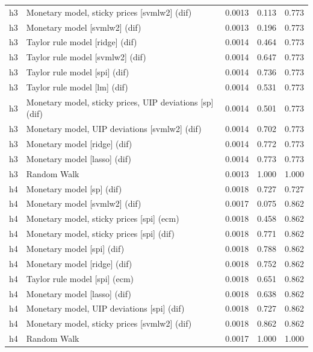\begin{ThreePartTable}
\begin{longtable}[t]{cp{5.5cm}ccc}
\addlinespace
h3 & \raggedright Monetary model, sticky prices [svmlw2] (dif) & 0.0013 & 0.113 & 0.773\\
h3 & \raggedright Monetary model [svmlw2] (dif) & 0.0013 & 0.196 & 0.773\\
h3 & \raggedright Taylor rule model [ridge] (dif) & 0.0014 & 0.464 & 0.773\\
h3 & \raggedright Taylor rule model [svmlw2] (dif) & 0.0014 & 0.647 & 0.773\\
h3 & \raggedright Taylor rule model [spi] (dif) & 0.0014 & 0.736 & 0.773\\
h3 & \raggedright Taylor rule model [lm] (dif) & 0.0014 & 0.531 & 0.773\\
h3 & \raggedright Monetary model, sticky prices, UIP deviations [sp] (dif) & 0.0014 & 0.501 & 0.773\\
h3 & \raggedright Monetary model, UIP deviations [svmlw2] (dif) & 0.0014 & 0.702 & 0.773\\
h3 & \raggedright Monetary model [ridge] (dif) & 0.0014 & 0.772 & 0.773\\
h3 & \raggedright Monetary model [lasso] (dif) & 0.0014 & 0.773 & 0.773\\
h3 & \raggedright Random Walk & 0.0013 & 1.000 & 1.000\\
\addlinespace
h4 & \raggedright Monetary model [sp] (dif) & 0.0018 & 0.727 & 0.727\\
h4 & \raggedright Monetary model [svmlw2] (dif) & 0.0017 & 0.075 & 0.862\\
h4 & \raggedright Monetary model, sticky prices [spi] (ecm) & 0.0018 & 0.458 & 0.862\\
h4 & \raggedright Monetary model, sticky prices [spi] (dif) & 0.0018 & 0.771 & 0.862\\
h4 & \raggedright Monetary model [spi] (dif) & 0.0018 & 0.788 & 0.862\\
h4 & \raggedright Monetary model [ridge] (dif) & 0.0018 & 0.752 & 0.862\\
h4 & \raggedright Taylor rule model [spi] (ecm) & 0.0018 & 0.651 & 0.862\\
h4 & \raggedright Monetary model [lasso] (dif) & 0.0018 & 0.638 & 0.862\\
h4 & \raggedright Monetary model, UIP deviations [spi] (dif) & 0.0018 & 0.727 & 0.862\\
h4 & \raggedright Monetary model, sticky prices [svmlw2] (dif) & 0.0018 & 0.862 & 0.862\\
h4 & \raggedright Random Walk & 0.0017 & 1.000 & 1.000\\

\end{longtable}
\end{ThreePartTable}

